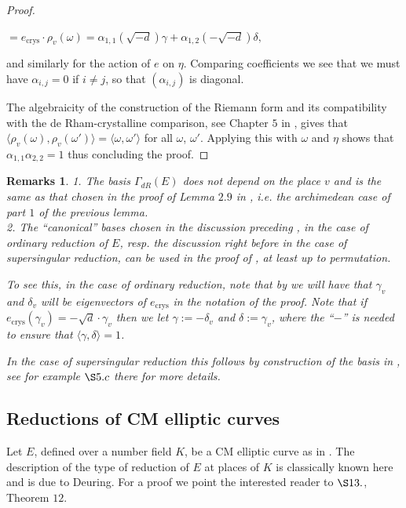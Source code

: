 \documentclass[12pt,twoside,a4paper]{article}
\theoremstyle{plain}%
\newtheorem{remarks}[theorem]{Remarks}
\DeclareMathOperator{\crys}{crys}
\begin{document}
\begin{proof}
\begin{center}
		$= e_{\crys}\cdot \rho_v(\omega)=\alpha_{1,1}(\sqrt{-d})\gamma+\alpha_{1,2}(-\sqrt{-d})\delta,$
	\end{center}and similarly for the action of $e$ on $\eta$. Comparing coefficients we see that we must have $\alpha_{i,j}=0$ if $i\neq j$, so that $(\alpha_{i,j})$ is diagonal.
	
	The algebraicity of the construction of the Riemann form and its compatibility with the de Rham-crystalline comparison, see Chapter $5$ in \cite{berbreenmessing}, gives that $\langle \rho_v(\omega), \rho_v(\omega')\rangle =\langle\omega,\omega'\rangle$ for all $\omega$, $\omega'$. Applying this with $\omega$ and $\eta$ shows that $\alpha_{1,1} \alpha_{2,2}=1$ thus concluding the proof.\end{proof}

\begin{remarks}1. The basis $\Gamma_{dR}(E)$ does not depend on the place $v$ and is the same as that chosen in the proof of Lemma $2.9$ in \cite{papaseffbrsieg}, i.e. the archimedean case of part $1$ of the previous lemma.\\
	
	2. The ``canonical'' bases chosen in the discussion preceding , in the case of ordinary reduction of $E$, resp. the discussion right before  in the case of supersingular reduction, can be used in the proof of , at least up to permutation. 
	
	To see this, in the case of ordinary reduction, note that by  we will have that $\gamma_v$ and $\delta_v$ will be eigenvectors of $e_{\crys}$ in the notation of the proof. Note that if $e_{\crys}(\gamma_v)=-\sqrt{d}\cdot \gamma_v$ then we let $\gamma:=-\delta_v$ and $\delta:=\gamma_v$, where the ``$-$'' is needed to ensure that $\langle \gamma, \delta\rangle =1$.
	
	In the case of supersingular reduction this follows by construction of the basis in \cite{andremots}, see for example $\S5.c$ there for more details.
\end{remarks}

\subsection{Reductions of CM elliptic curves}\label{section:backgroundcmlv}

Let $E$, defined over a number field $K$, be a CM elliptic curve as in . The description of the type of reduction of $E$ at places of $K$ is classically known here and is due to Deuring. For a proof we point the interested reader to \cite{langellfuns} $\S 13.$, Theorem $12$. 
\end{document}
